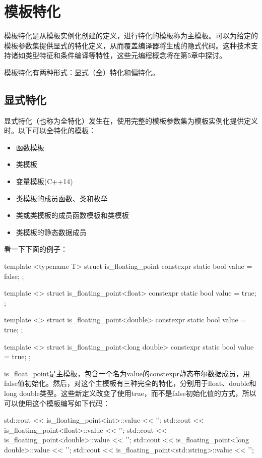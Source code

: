 \section{模板特化}

模板特化是从模板实例化创建的定义，进行特化的模板称为主模板。可以为给定的模板参数集提供显式的特化定义，从而覆盖编译器将生成的隐式代码。这种技术支持诸如类型特征和条件编译等特性，这些元编程概念将在第5章中探讨。

模板特化有两种形式：显式（全）特化和偏特化。

\subsection{显式特化}

显式特化（也称为全特化）发生在，使用完整的模板参数集为模板实例化提供定义时。以下可以全特化的模板：

\begin{itemize}
  \item 函数模板
  \item 类模板
  \item 变量模板(C++14)
  \item 类模板的成员函数、类和枚举
  \item 类或类模板的成员函数模板和类模板
  \item 类模板的静态数据成员
\end{itemize}

看一下下面的例子：

\begin{cppcode}
template <typename T>
struct is_floating_point
{
	constexpr static bool value = false;
};

template <>
struct is_floating_point<float>
{
	constexpr static bool value = true;
};

template <>
struct is_floating_point<double>
{
	constexpr static bool value = true;
};

template <>
struct is_floating_point<long double>
{
	constexpr static bool value = true;
};
\end{cppcode}

is_float_point是主模板，包含一个名为value的constexpr静态布尔数据成员，用false值初始化。然后，对这个主模板有三种完全的特化，分别用于float、double和long double类型。这些新定义改变了使用true，而不是false初始化值的方式，所以可以使用这个模板编写如下代码：

\begin{cppcode}
std::cout << is_floating_point<int>::value << '\n';
std::cout << is_floating_point<float>::value << '\n';
std::cout << is_floating_point<double>::value << '\n';
std::cout << is_floating_point<long double>::value << '\n';
std::cout << is_floating_point<std::string>::value << '\n';
\end{cppcode}

